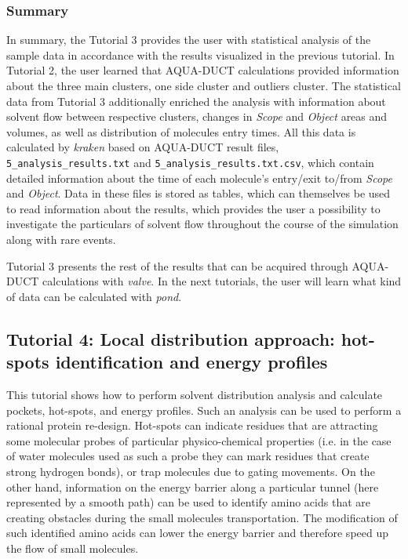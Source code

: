 \documentclass[9pt,tutorial, pubversion]{livecoms}
\begin{document}
\subsubsection{Summary}
In summary, the Tutorial 3 provides the user with statistical analysis of the sample data in accordance with the results visualized in the previous tutorial. In Tutorial 2, the user learned that AQUA-DUCT calculations provided information about the three main clusters, one side cluster and outliers cluster. The statistical data from Tutorial 3 additionally enriched the analysis with information about solvent flow between respective clusters, changes in \textit{Scope} and \textit{Object} areas and volumes, as well as distribution of molecules entry times. All this data is calculated by \textit{kraken} based on AQUA-DUCT result files, \texttt{5\_analysis\_results.txt} and \texttt{5\_analysis\_results.txt.csv}, which contain detailed information about the time of each molecule's entry/exit to/from \textit{Scope} and \textit{Object}. Data in these files is stored as tables, which can themselves be used to read information about the results, which provides the user a possibility to investigate the particulars of solvent flow throughout the course of the simulation along with rare events. 

Tutorial 3 presents the rest of the results that can be acquired through AQUA-DUCT calculations with \textit{valve}. In the next tutorials, the user will learn what kind of data can be calculated with \textit{pond}.

\subsection{Tutorial 4: Local distribution approach: hot-spots identification and energy profiles}

This tutorial shows how to perform solvent distribution analysis and calculate pockets, hot-spots, and energy profiles. Such an analysis can be used to perform a rational protein re-design. Hot-spots can indicate residues that are attracting some molecular probes of particular physico-chemical properties (i.e. in the case of water molecules used as such a probe they can mark residues that create strong hydrogen bonds), or trap molecules due to gating movements. On the other hand, information on the energy barrier along a particular tunnel (here represented by a smooth path) can be used to identify amino acids that are creating obstacles during the small molecules transportation. The modification of such identified amino acids can lower the energy barrier and therefore speed up the flow of small molecules.
\end{document}
